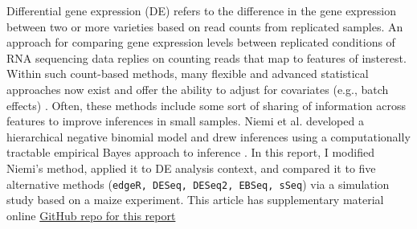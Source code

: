 Differential gene expression (DE) refers to the difference in the gene expression between two or more varieties based on read counts from replicated samples. An approach for comparing gene expression levels between replicated conditions of RNA sequencing data replies on counting reads that map to features of insterest. Within such count-based methods, many flexible and advanced statistical approaches now exist and offer the ability to adjust for covariates (e.g., batch effects) \citep{zhou2014robustly}. Often, these methods include some sort of sharing of information across features to improve inferences in small samples. Niemi et al. developed a hierarchical negative binomial model and drew inferences using a computationally tractable empirical Bayes approach to inference \citep{niemi2015empirical}. In this report, I modified Niemi's method, applied it to DE analysis context, and compared it to five alternative methods ({\tt edgeR, DESeq, DESeq2, EBSeq, sSeq}) via a simulation study based on a maize experiment. This article has supplementary material online \href{https://github.com/jarad/eBayes_differential_expression}{GitHub repo for this report} 